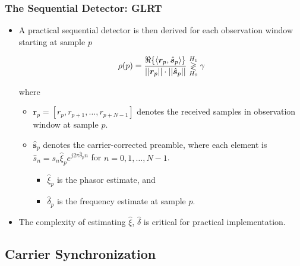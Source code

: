 \begin{frame}
  \frametitle{The Sequential Detector: GLRT}
    \begin{itemize}
    
        \item A practical sequential detector is then derived for each observation window starting at sample $p$
        
        \begin{equation*}
          \label{eq:generalized_corr}
          \rho(p)=
          \frac{\Re\{\langle
            \boldsymbol{r}_{p},\hat{\boldsymbol{s}}_{p}\rangle\}}
          {||\boldsymbol{r}_{p}||\cdot||\hat{\boldsymbol{s}}_{p}||} \mathrel{\mathop\gtrless\limits^{H_1}_{H_0}} \gamma
        \end{equation*}

        where 
        \begin{itemize}
          \item $\bm{r}_{p}=[r_{p},r_{p+1},\ldots,r_{p{+}N{-}1}]$ denotes the received samples in observation window
          at sample $p$.
          \item $\hat{\bm{s}}_{p}$ denotes the carrier-corrected preamble,
          where each element is $\hat{s}_{n}=s_n\hat{\xi}_{p}e^{j2\pi\hat{\delta}_{p}n}$
          for $n=0,1,\ldots,N{-}1$.
          \begin{itemize}
            \item $\hat{\xi}_{p}$ is the phasor estimate, and 
            \item $\hat{\delta}_{p}$ is the frequency estimate at sample $p$.
          \end{itemize}          

        \end{itemize}

        \item The complexity of estimating $\hat{\xi}$, $\hat{\delta}$ is critical for practical implementation.         
        
    \end{itemize}

\end{frame}

\subsection{Carrier Synchronization}

